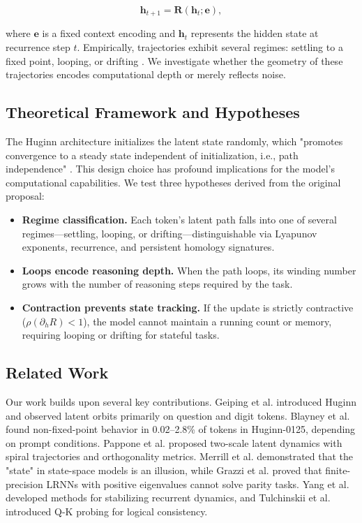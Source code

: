 \documentclass[12pt,a4paper]{article}
\begin{document}
\begin{equation}
    \mathbf{h}_{t+1} = \mathbf{R}(\mathbf{h}_t; \mathbf{e}),
\end{equation}

where $\mathbf{e}$ is a fixed context encoding and $\mathbf{h}_t$ represents the hidden state at recurrence step $t$. Empirically, trajectories exhibit several regimes: settling to a fixed point, looping, or drifting \cite{geiping2025scaling}. We investigate whether the geometry of these trajectories encodes computational depth or merely reflects noise.

\subsection{Theoretical Framework and Hypotheses}

The Huginn architecture initializes the latent state randomly, which "promotes convergence to a steady state independent of initialization, i.e., path independence" \cite{geiping2025scaling}. This design choice has profound implications for the model's computational capabilities. We test three hypotheses derived from the original proposal:

\begin{itemize}
    \item[H1] \textbf{Regime classification.} Each token's latent path falls into one of several regimes—settling, looping, or drifting—distinguishable via Lyapunov exponents, recurrence, and persistent homology signatures.
    \item[H2] \textbf{Loops encode reasoning depth.} When the path loops, its winding number grows with the number of reasoning steps required by the task.
    \item[H3] \textbf{Contraction prevents state tracking.} If the update is strictly contractive ($\rho(\partial_h R) < 1$), the model cannot maintain a running count or memory, requiring looping or drifting for stateful tasks.
\end{itemize}

\subsection{Related Work}

Our work builds upon several key contributions. Geiping et al. \cite{geiping2025scaling} introduced Huginn and observed latent orbits primarily on question and digit tokens. Blayney et al. \cite{blayney2026mechanistic} found non-fixed-point behavior in 0.02--2.8\% of tokens in Huginn-0125, depending on prompt conditions. Pappone et al. \cite{pappone2025two} proposed two-scale latent dynamics with spiral trajectories and orthogonality metrics. Merrill et al. \cite{merrill2024illusion} demonstrated that the "state" in state-space models is an illusion, while Grazzi et al. \cite{grazzi2024unlocking} proved that finite-precision LRNNs with positive eigenvalues cannot solve parity tasks. Yang et al. \cite{yang2025stabilizing} developed methods for stabilizing recurrent dynamics, and Tulchinskii et al. \cite{tulchinskii2025quantifying} introduced Q-K probing for logical consistency.
\end{document}
